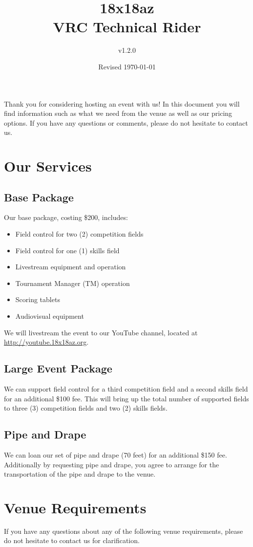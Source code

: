 \documentclass[12pt]{article}
\title{18x18az\\VRC Technical Rider}
\author{v1.2.0}
\date{Revised \today}
\begin{document}
\maketitle
Thank you for considering hosting an event with us!
In this document you will find information such as what we need from the venue as well as our pricing options.
If you have any questions or comments, please do not hesitate to contact us.
\tableofcontents
\pagebreak
\section{Our Services}
\subsection{Base Package}
Our base package, costing \$200, includes:
\begin{itemize}
    \item Field control for two (2) competition fields
    \item Field control for one (1) skills field
    \item Livestream equipment and operation
    \item Tournament Manager (TM) operation
    \item Scoring tablets
    \item Audiovisual equipment
\end{itemize}

\noindent We will livestream the event to our YouTube channel, located at \\\url{http://youtube.18x18az.org}.

\subsection{Large Event Package}
We can support field control for a third competition field and a second skills field for an additional \$100 fee.
This will bring up the total number of supported fields to three (3) competition fields and two (2) skills fields.

\subsection{Pipe and Drape}
We can loan our set of pipe and drape (70 feet) for an additional \$150 fee.
Additionally by requesting pipe and drape, you agree to arrange for the transportation of the pipe and drape to the venue.

\section{Venue Requirements}
If you have any questions about any of the following venue requirements, please do not hesitate to contact us for clarification.
\end{document}
